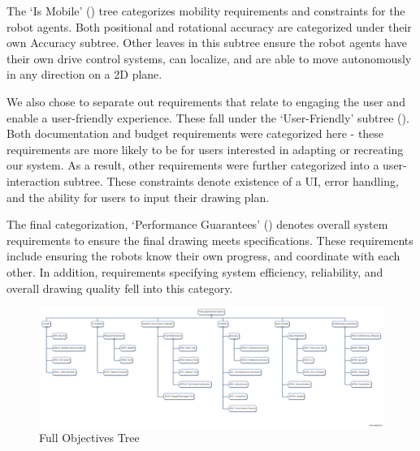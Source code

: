 The `Is Mobile' () tree categorizes mobility requirements and constraints for the robot agents. Both positional and rotational accuracy are categorized under their own Accuracy subtree. Other leaves in this subtree ensure the robot agents have their own drive control systems, can localize, and are able to move autonomously in any direction on a 2D plane.

We also chose to separate out requirements that relate to engaging the user and  enable a user-friendly experience. These fall under the `User-Friendly' subtree (). Both documentation and budget requirements were categorized here - these requirements are more likely to be for users interested in adapting or recreating our system. As a result, other requirements were further categorized into a user-interaction subtree. These constraints denote existence of a UI, error handling, and the ability for users to input their drawing plan.

The final categorization, `Performance Guarantees' () denotes overall system requirements to ensure the final drawing meets specifications. These requirements include ensuring the robots know their own progress, and coordinate with each other. In addition, requirements specifying system efficiency, reliability, and overall drawing quality fell into this category.

\begin{figure}[!ht]
\centering
\includegraphics[width=0.98\columnwidth]{figs/objectives_tree/objectives_tree_4_2_17.png}
\caption{Full Objectives Tree}
\label{fig:objTreeFull}
\end{figure}


